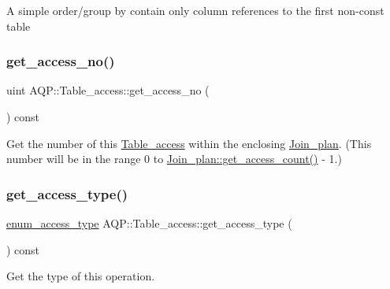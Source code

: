 A \textquotesingle{}simple\textquotesingle{} order/group by contain only column references to the first non-\/const table\mbox{\label{classAQP_1_1Table__access_a157f02f305d45857fcba1274345b93f2}} 
\subsubsection{\texorpdfstring{get\+\_\+access\+\_\+no()}{get\_access\_no()}}
{\footnotesize\ttfamily uint A\+Q\+P\+::\+Table\+\_\+access\+::get\+\_\+access\+\_\+no (\begin{DoxyParamCaption}{ }\end{DoxyParamCaption}) const\hspace{0.3cm}{\ttfamily [inline]}}

Get the number of this \mbox{\hyperlink{classAQP_1_1Table__access}{Table\+\_\+access}} within the enclosing \mbox{\hyperlink{classAQP_1_1Join__plan}{Join\+\_\+plan}}. (This number will be in the range 0 to \mbox{\hyperlink{classAQP_1_1Join__plan_a92950b7a49e0702cf5490b0f0797a076}{Join\+\_\+plan\+::get\+\_\+access\+\_\+count()}} -\/ 1.) \mbox{\label{classAQP_1_1Table__access_aa0f6bf2c2cdc429e39313adcec8745e3}} 
\subsubsection{\texorpdfstring{get\+\_\+access\+\_\+type()}{get\_access\_type()}}
{\footnotesize\ttfamily \mbox{\hyperlink{namespaceAQP_a4aaae4a1dc295a865368c9822d4dd0a5}{enum\+\_\+access\+\_\+type}} A\+Q\+P\+::\+Table\+\_\+access\+::get\+\_\+access\+\_\+type (\begin{DoxyParamCaption}{ }\end{DoxyParamCaption}) const\hspace{0.3cm}{\ttfamily [inline]}}

Get the type of this operation. \mbox{\label{classAQP_1_1Table__access_a8aec8683398027cb6a5302c344285113}} 
